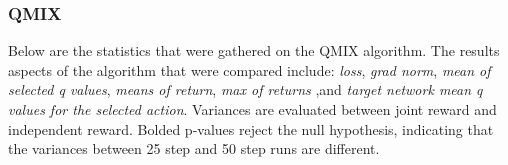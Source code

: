 \documentclass[systems,article,submit,pdftex,moreauthors]{Definitions/mdpi}
\begin{document}
\begin{table}[!h]
\caption{P-values of Bartlett's test for homogeneity of variances for the mean return values VDN between 25 timesteps and 50 timesteps grouped by scenario.}
\label{tab:vdn-mean-return}
\end{table}

\begin{table}[!h]
\caption{P-values of Bartlett's test for homogeneity of variances for the max return values VDN between 25 timesteps and 50 timesteps grouped by scenario.}
\label{tab:vdn-return-max}
\end{table}


\subsubsection*{QMIX}
Below are the statistics that were gathered on the QMIX algorithm. The results aspects of the algorithm that were compared include: \textit{loss}, \textit{grad norm}, \textit{mean of selected q values}, \textit{means of return}, \textit{max of returns} ,and \textit{target network mean q values for the selected action}. 
Variances are evaluated between joint reward and independent reward. Bolded p-values reject the null hypothesis, indicating that the variances between 25 step and 50 step runs are different.
\end{document}
